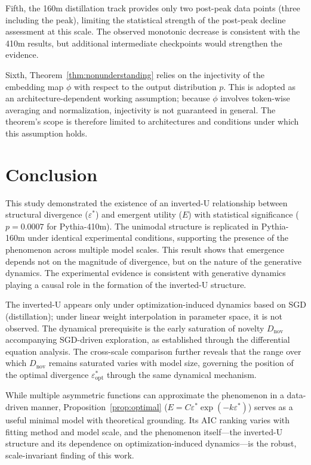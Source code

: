 \documentclass[11pt,a4paper]{article}
\begin{document}
Fifth, the 160m distillation track provides only two post-peak data points (three including the
peak), limiting the statistical strength of the post-peak decline assessment at this scale. The
observed monotonic decrease is consistent with the 410m results, but additional intermediate
checkpoints would strengthen the evidence.

Sixth, Theorem~\ref{thm:nonunderstanding} relies on the injectivity of the embedding map
$\phi$ with respect to the output distribution $p$. This is adopted as an
architecture-dependent working assumption; because $\phi$ involves token-wise averaging and
normalization, injectivity is not guaranteed in general. The theorem's scope is therefore
limited to architectures and conditions under which this assumption holds.

\section{Conclusion}

This study demonstrated the existence of an inverted-U relationship between structural
divergence ($\varepsilon^*$) and emergent utility ($E$) with statistical significance
($p = 0.0007$ for Pythia-410m). The unimodal structure is replicated in Pythia-160m under
identical experimental conditions, supporting the presence of the phenomenon across multiple
model scales. This result shows that emergence depends not on the magnitude of divergence, but
on the nature of the generative dynamics. The experimental evidence is consistent with
generative dynamics playing a causal role in the formation of the inverted-U structure.

The inverted-U appears only under optimization-induced dynamics based on SGD (distillation);
under linear weight interpolation in parameter space, it is not observed.
The dynamical prerequisite is the early saturation of novelty $D_\mathrm{nov}$ accompanying
SGD-driven exploration, as established through the differential equation analysis. The
cross-scale comparison further reveals that the range over which $D_\mathrm{nov}$ remains
saturated varies with model size, governing the position of the optimal divergence
$\varepsilon^*_\mathrm{opt}$ through the same dynamical mechanism.

While multiple asymmetric functions can approximate the phenomenon in a data-driven manner,
Proposition~\ref{prop:optimal} ($E = C\varepsilon^*\exp(-k\varepsilon^*)$) serves as a useful
minimal model with theoretical grounding. Its AIC ranking varies with fitting method and model
scale, and the phenomenon itself---the inverted-U structure and its dependence on
optimization-induced dynamics---is the robust, scale-invariant finding of this work.
\end{document}
